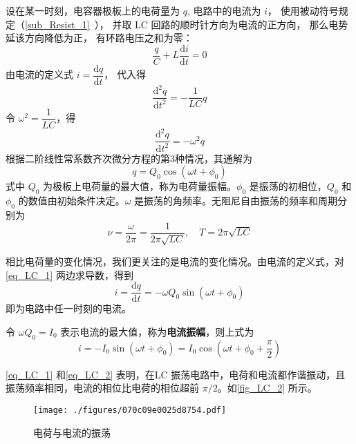 设在某一时刻，电容器极板上的电荷量为 $q$, 电路中的电流为 $i$， 使用被动符号规定（\autoref{sub_Resist_1}~）， 并取 LC 回路的顺时针方向为电流的正方向， 那么电势延该方向降低为正， 有环路电压之和为零：
\begin{equation}
\frac{q}{C} + L \frac{\mathrm{d} i}{\mathrm{d} t} = 0
\end{equation}
由电流的定义式 $i=\dfrac{\mathrm{d} q}{\mathrm{d} t}$， 代入得
\begin{equation}
\frac{\mathrm{d}^{2} q}{\mathrm{d} t^{2}}=-\frac{1}{L C} q
\end{equation}
令 $\omega^{2}=\dfrac{1}{L C}$，得
\begin{equation}
\frac{\mathrm{d}^{2} q}{\mathrm{d} t^{2}}=-\omega^{2} q
\end{equation}
根据二阶线性常系数齐次微分方程的第3种情况，其通解为
\begin{equation} \label{eq_LC_1}
q=Q_{0} \cos \left(\omega t+\phi_{0}\right)
\end{equation}
式中 $Q_0$ 为极板上电荷量的最大值，称为电荷量振幅。$\phi_0$ 是振荡的初相位，$Q_0$ 和 $\phi_0$ 的数值由初始条件决定。$\omega$ 是振荡的角频率。无阻尼自由振荡的频率和周期分别为
\begin{equation}
\nu=\frac{\omega}{2 \pi}=\frac{1}{2 \pi \sqrt{L C}}, \quad T=2 \pi \sqrt{L C}
\end{equation}

相比电荷量的变化情况，我们更关注的是电流的变化情况。由电流的定义式，对\autoref{eq_LC_1} 两边求导数，得到
\begin{equation}
i=\frac{\mathrm{d} q}{\mathrm{d} t}=-\omega Q_{0} \sin \left(\omega t+\phi_{0}\right)
\end{equation}
即为电路中任一时刻的电流。

令 $\omega Q_0=I_0$ 表示电流的最大值，称为\textbf{电流振幅}，则上式为
\begin{equation} \label{eq_LC_2}
i=-I_{0} \sin \left(\omega t+\phi_{0}\right)=I_{0} \cos \left(\omega t+\phi_{0}+\frac{\pi}{2}\right)
\end{equation}

\autoref{eq_LC_1} 和\autoref{eq_LC_2} 表明，在LC 振荡电路中，电荷和电流都作谐振动，且振荡频率相同，电流的相位比电荷的相位超前 $\pi/2$。如\autoref{fig_LC_2} 所示。

\begin{figure}[ht]
\centering
\texttt{[image: ./figures/070c09e0025d8754.pdf]}
\caption{电荷与电流的振荡} \label{fig_LC_2}
\end{figure}

